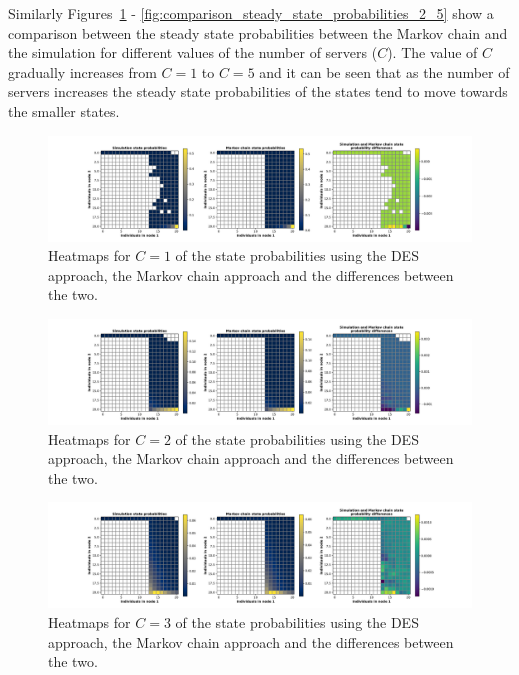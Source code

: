 Similarly Figures~\ref{fig:comparison_steady_state_probabilities_2_1} -
\ref{fig:comparison_steady_state_probabilities_2_5} show a comparison between
the steady state probabilities between the Markov chain and the simulation
for different values of the number of servers (\(C\)).
The value of \(C\) gradually increases from \(C = 1\) to \(C = 5\) and it can
be seen that as the number of servers increases the steady state probabilities
of the states tend to move towards the smaller states.


\begin{figure}[H]
    \includegraphics[width=\textwidth, trim=100 10 100 10, clip]{chapters/03_queueing_model/Bin/numeric_results_and_timings/steady_state_probabilities_2/main_1.pdf}
    \caption{Heatmaps for \(C = 1\) of the state probabilities using the
    DES approach, the Markov chain approach and the differences between the
    two.}
    \label{fig:comparison_steady_state_probabilities_2_1}
\end{figure}

\begin{figure}[H]
    \includegraphics[width=\textwidth, trim=100 10 100 10, clip]{chapters/03_queueing_model/Bin/numeric_results_and_timings/steady_state_probabilities_2/main_2.pdf}
    \caption{Heatmaps for \(C = 2\) of the state probabilities using the
    DES approach, the Markov chain approach and the differences between the
    two.}
    \label{fig:comparison_steady_state_probabilities_2_2}
\end{figure}

\begin{figure}[H]
    \includegraphics[width=\textwidth, trim=100 10 100 10, clip]{chapters/03_queueing_model/Bin/numeric_results_and_timings/steady_state_probabilities_2/main_3.pdf}
    \caption{Heatmaps for \(C = 3\) of the state probabilities using the
    DES approach, the Markov chain approach and the differences between the
    two.}
    \label{fig:comparison_steady_state_probabilities_2_3}
\end{figure}

